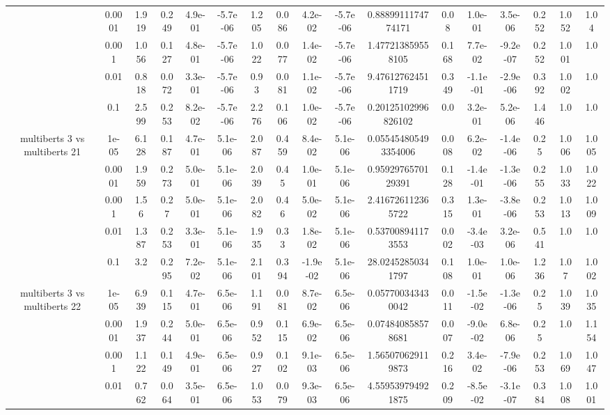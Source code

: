 \begin{tabular}{|c|c|c|c|c|c|c|c|c|c|c|c|c|c|c|c|c|}
 & 0.0001 & 1.919 & 0.249 & 4.9e-01 & -5.7e-06 & 1.205 & 0.086 & 4.2e-02 & -5.7e-06 & 0.8889911174774171 & 0.08 & 1.0e-01 & 3.5e-06 & 0.252 & 1.052 & 1.04 \\
 & 0.001 & 1.056 & 0.127 & 4.8e-01 & -5.7e-06 & 1.022 & 0.077 & 1.4e-02 & -5.7e-06 & 1.477213859558105 & 0.168 & 7.7e-02 & -9.2e-07 & 0.252 & 1.001 & 1.0 \\
 & 0.01 & 0.818 & 0.072 & 3.3e-01 & -5.7e-06 & 0.93 & 0.081 & 1.1e-02 & -5.7e-06 & 9.476127624511719 & 0.349 & -1.1e-01 & -2.9e-06 & 0.392 & 1.002 & 1.0 \\
 & 0.1 & 2.599 & 0.253 & 8.2e-02 & -5.7e-06 & 2.276 & 0.106 & 1.0e-02 & -5.7e-06 & 0.20125102996826102 & 0.0 & 3.2e-01 & 5.2e-06 & 1.446 & 1.0 & 1.0 \\
\hline
\multirow{5}{*}{multiberts 3 vs multiberts 21} & 1e-05 & 6.128 & 0.187 & 4.7e-01 & 5.1e-06 & 2.087 & 0.459 & 8.4e-02 & 5.1e-06 & 0.055454805493354006 & 0.008 & 6.2e-02 & -1.4e-06 & 0.25 & 1.006 & 1.005 \\
 & 0.0001 & 1.959 & 0.273 & 5.0e-01 & 5.1e-06 & 2.039 & 0.45 & 1.0e-01 & 5.1e-06 & 0.9592976570129391 & 0.128 & -1.4e-01 & -1.3e-06 & 0.255 & 1.033 & 1.022 \\
 & 0.001 & 1.56 & 0.27 & 5.0e-01 & 5.1e-06 & 2.082 & 0.46 & 5.0e-02 & 5.1e-06 & 2.416726112365722 & 0.315 & 1.3e-01 & -3.8e-06 & 0.253 & 1.013 & 1.009 \\
 & 0.01 & 1.387 & 0.253 & 3.3e-01 & 5.1e-06 & 1.935 & 0.33 & 1.8e-02 & 5.1e-06 & 0.537008941173553 & 0.002 & -3.4e-03 & 3.2e-06 & 0.541 & 1.0 & 1.0 \\
 & 0.1 & 3.2 & 0.295 & 7.2e-02 & 5.1e-06 & 2.101 & 0.394 & -1.9e-02 & 5.1e-06 & 28.02452850341797 & 0.108 & 1.0e-01 & 1.0e-06 & 1.236 & 1.07 & 1.002 \\
\hline
\multirow{5}{*}{multiberts 3 vs multiberts 22} & 1e-05 & 6.939 & 0.115 & 4.7e-01 & 6.5e-06 & 1.191 & 0.081 & 8.7e-02 & 6.5e-06 & 0.057700343430042 & 0.011 & -1.5e-02 & -1.3e-06 & 0.25 & 1.039 & 1.035 \\
 & 0.0001 & 1.937 & 0.244 & 5.0e-01 & 6.5e-06 & 0.952 & 0.115 & 6.9e-02 & 6.5e-06 & 0.074840858578681 & 0.007 & -9.0e-02 & 6.8e-06 & 0.25 & 1.0 & 1.154 \\
 & 0.001 & 1.122 & 0.149 & 4.9e-01 & 6.5e-06 & 0.927 & 0.102 & 9.1e-03 & 6.5e-06 & 1.565070629119873 & 0.216 & 3.4e-02 & -7.9e-06 & 0.253 & 1.069 & 1.047 \\
 & 0.01 & 0.762 & 0.064 & 3.5e-01 & 6.5e-06 & 1.053 & 0.079 & 9.3e-03 & 6.5e-06 & 4.559539794921875 & 0.209 & -8.5e-02 & -3.1e-07 & 0.384 & 1.008 & 1.001 \\

\end{tabular}
